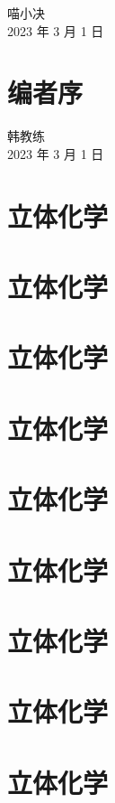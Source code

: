 \documentclass[
  10pt,
  twoside,
  openany,
  b5paper, %
  colorscheme = basic, %
]{qyxf-book}
\begin{document}
\begin{flushright}
	喵小决\\
	2023 年 3 月 1 日
\end{flushright}

\chapter*{编者序}



\begin{flushright}
	韩教练\\
	2023 年 3 月 1 日
\end{flushright}

\cleardoublepage


\tableofcontents

\chapter{立体化学}

\chapter{立体化学}

\chapter{立体化学}

\chapter{立体化学}

\chapter{立体化学}

\chapter{立体化学}

\chapter{立体化学}

\chapter{立体化学}

\chapter{立体化学}
\end{document}
